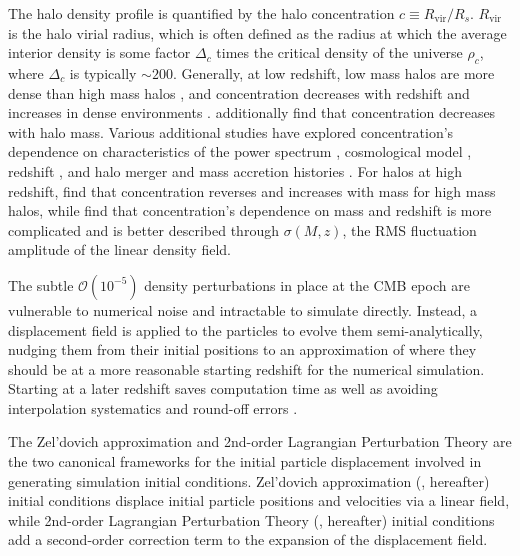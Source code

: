 The halo density profile is quantified by the halo concentration $c \equiv R_{\mathrm{vir}} / R_{s}$.  $R_{\mathrm{vir}}$ is the halo virial radius, which is often defined as the radius at which the average interior density is some factor $\Delta_{c}$ times the critical density of the universe $\rho_{c}$, where $\Delta_{c}$ is typically $\sim 200$.  Generally, at low redshift, low mass halos are more dense than high mass halos \citep{1997ApJ...490..493N}, and concentration decreases with redshift and increases in dense environments \citep{2001MNRAS.321..559B}.  \citet{2007MNRAS.381.1450N} additionally find that concentration decreases with halo mass.  Various additional studies have explored concentration's dependence on characteristics of the power spectrum \citep{2001ApJ...554..114E}, cosmological model \citep{2008MNRAS.391.1940M}, redshift \citep{2008MNRAS.387..536G, 2011MNRAS.411..584M}, and halo merger and mass accretion histories \citep{2002ApJ...568...52W, 2003MNRAS.339...12Z, 2009ApJ...707..354Z}.  For halos at high redshift, \citet{2011ApJ...740..102K} find that concentration reverses and increases with mass for high mass halos, while \citet{2012MNRAS.423.3018P} find that concentration's dependence on mass and redshift is more complicated and is better described through $\sigma(M,z)$, the RMS fluctuation amplitude of the linear density field.






The subtle $\mathcal{O}(10^{-5})$ density perturbations in place at the CMB epoch are vulnerable to numerical noise and intractable to simulate directly.  Instead, a displacement field is applied to the particles to evolve them semi-analytically, nudging them from their initial positions to an approximation of where they should be at a more reasonable starting redshift for the numerical simulation.  Starting at a later redshift saves computation time as well as avoiding interpolation systematics and round-off errors \citep{2007ApJ...671.1160L}.






The Zel'dovich approximation \citep{1970A&A.....5...84Z} and 2nd-order Lagrangian Perturbation Theory \citep{1994MNRAS.267..811B, 1994A&A...288..349B, 1995A&A...296..575B, 1998MNRAS.299.1097S} are the two canonical frameworks for the initial particle displacement involved in generating simulation initial conditions.  Zel'dovich approximation (\za, hereafter) initial conditions \citep{1983MNRAS.204..891K, 1985ApJS...57..241E} displace initial particle positions and velocities via a linear field, while 2nd-order Lagrangian Perturbation Theory (\lpt, hereafter) initial conditions \citep{1998MNRAS.299.1097S, 2005ApJ...634..728S, 2010MNRAS.403.1859J} add a second-order correction term to the expansion of the displacement field.

